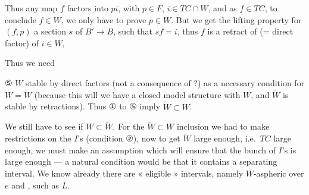 \documentclass[11pt,a4paper]{article}
\begin{document}
Thus any map $f$ factors into $pi$, with $p \in F$,
$i \in TC \cap W$, and as $f \in TC$, to conclude $f \in W$, we only
have to prove $p \in W$. But we get the lifting property for $(f, p)$ a
section $s$ of $B' \to B$, such that $sf = i$, thus $f$ is a retract of
(= direct factor) of $i \in W$,




Thus we need 

⑤ $W$ stable by direct factors (not a consequence of
 ?) as a necessary condition for
$W = \widetilde{W}$ (because this will \ill{} we have a closed model
structure with $W$, \struck{\ill{}} and $\widetilde{W}$ is stable by
retractions). Thus ① to ⑤ imply $\widetilde{W} \subset W$.

We still have to see if $W \subset \widetilde{W}$. For the
$\widetilde{W} \subset W$ inclusion  we had to make
restrictions on the $I$'s (condition ②), now to get $\widetilde{W}$ large
enough, i.e.\ $TC$ large enough, we must make an assumption which will
ensure that the bunch of $I$'s is large enough — a natural condition would
be that it contains a separating interval. We know already there are
« eligible » intervals, namely $W$-aspheric over $e$ and
, such as $L$.
\end{document}
